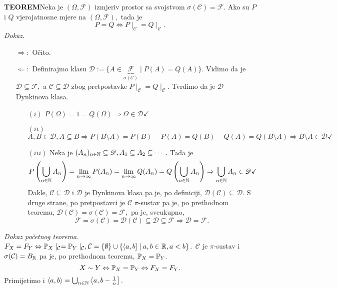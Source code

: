 \documentclass{article}
\begin{document}
\newline\newline
\textbf{TEOREM}\newline Neka je \((\Omega,\mathcal F)\) izmjeriv prostor sa svojstvom \(\sigma(\mathcal C)=\mathcal F.\) Ako su \(P\) i \(Q\) vjerojatnosne mjere na \((\Omega,\mathcal F),\) tada je \[P=Q\Leftrightarrow P\mid_\mathcal C=Q\mid_\mathcal C.\] 
\textit{Dokaz.}
\begin{itemize}
    \item[\(\boxed{\Rightarrow}:\)] Očito.
    \item[\(\boxed{\Leftarrow}:\)] Definirajmo klasu \(\mathscr D:=\{A\in\underbrace{\mathcal F}_{\sigma(\mathcal C)}\mid  P(A)=Q(A)\}.\) Vidimo da je \(\mathscr D\subseteq\mathcal F,\) a \(\mathcal C\subseteq\mathscr D\) zbog pretpostavke \(P\mid_\mathcal C=Q\mid_\mathcal C.\) Tvrdimo da je \(\mathscr D\) Dynkinova klasa.\begin{itemize}
        \item[\((i)\)] \(P(\Omega)=1=Q(\Omega)\Rightarrow\Omega\in\mathscr D\checkmark\)
        \item[\((ii)\)] \(A,B\in\mathscr D,A\subseteq B\Rightarrow P(B\setminus A)=P(B)-P(A)=Q(B)-Q(A)=Q(B\setminus A)\Rightarrow B\setminus A\in\mathscr D\checkmark\)
        \item[\((iii)\)] Neka je \((A_n)_{n\in\Bbb N}\subseteq\mathscr D,A_1\subseteq A_2\subseteq\cdots.\) Tada je \[P\left(\bigcup_{n\in\Bbb N}A_n\right)=\lim_{n\to\infty}P(A_n)=\lim_{n\to\infty}Q(A_n)=Q\left(\bigcup_{n\in\Bbb N}A_n\right)\Rightarrow\bigcup_{n\in\Bbb N}A_n\in\mathscr D\checkmark\] Dakle, \(\mathcal C\subseteq\mathscr D\) i \(\mathscr D\) je Dynkinova klasa pa je, po definiciji, \(\mathscr D(\mathcal C)\subseteq\mathscr D.\) S druge strane, po pretpostavci je \(\mathcal C\) \(\pi\)-sustav pa je, po prethodnom teoremu, \(\mathscr D(\mathcal C)=\sigma(\mathcal C)=\mathcal F,\) pa je, sveukupno, \[\mathcal F=\sigma(\mathcal C)=\mathscr D(\mathcal C)\subseteq\mathscr D\subseteq\mathcal F\Rightarrow\mathscr D=\mathcal F.\] 
    \end{itemize}
\end{itemize}
\textit{Dokaz početnog teorema.}\newline
\(F_X=F_Y\Leftrightarrow\Bbb P_X\mid_\mathcal C=\Bbb P_Y\mid_\mathcal C,\mathcal C=\{\emptyset\}\cup\left\{\langle a,b]\mid a,b\in\Bbb R,a<b\right\}.\) \(\mathcal C\) je \(\pi\)-sustav i \(\sigma(\mathcal C)= B_\Bbb R\) pa je, po prethodnom teoremu, \(\Bbb P_X=\Bbb P_Y.\)\newline \[X\sim Y\Leftrightarrow\Bbb P_X=\Bbb P_Y\Leftrightarrow F_X=F_Y.\] Primijetimo i \(\langle a,b\rangle=\bigcup_{n\in\Bbb N}\left\langle a,b-\frac1n\right].\)\newline\newline
\end{document}
